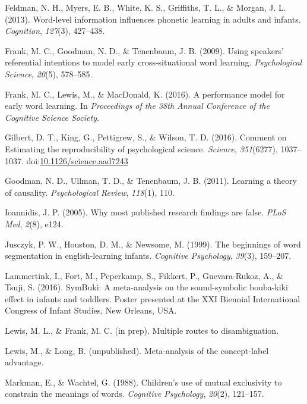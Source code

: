 \documentclass[english,floatsintext,man]{apa6}
\begin{document}
\hypertarget{ref-feldman2013word}{}
Feldman, N. H., Myers, E. B., White, K. S., Griffiths, T. L., \& Morgan,
J. L. (2013). Word-level information influences phonetic learning in
adults and infants. \emph{Cognition}, \emph{127}(3), 427--438.

\hypertarget{ref-frank2009using}{}
Frank, M. C., Goodman, N. D., \& Tenenbaum, J. B. (2009). Using
speakers' referential intentions to model early cross-situational word
learning. \emph{Psychological Science}, \emph{20}(5), 578--585.

\hypertarget{ref-frank2016performance}{}
Frank, M. C., Lewis, M., \& MacDonald, K. (2016). A performance model
for early word learning. In \emph{Proceedings of the 38th Annual
Conference of the Cognitive Science Society}.

\hypertarget{ref-Gilbert1037}{}
Gilbert, D. T., King, G., Pettigrew, S., \& Wilson, T. D. (2016).
Comment on Estimating the reproducibility of psychological science.
\emph{Science}, \emph{351}(6277), 1037--1037.
doi:\href{https://doi.org/10.1126/science.aad7243}{10.1126/science.aad7243}

\hypertarget{ref-goodman2011learning}{}
Goodman, N. D., Ullman, T. D., \& Tenenbaum, J. B. (2011). Learning a
theory of causality. \emph{Psychological Review}, \emph{118}(1), 110.

\hypertarget{ref-ioannidis2005most}{}
Ioannidis, J. P. (2005). Why most published research findings are false.
\emph{PLoS Med}, \emph{2}(8), e124.

\hypertarget{ref-jusczyk1999beginnings}{}
Jusczyk, P. W., Houston, D. M., \& Newsome, M. (1999). The beginnings of
word segmentation in english-learning infants. \emph{Cognitive
Psychology}, \emph{39}(3), 159--207.

\hypertarget{ref-lammertink2016}{}
Lammertink, I., Fort, M., Peperkamp, S., Fikkert, P., Guevara-Rukoz, A.,
\& Tsuji, S. (2016). SymBuki: A meta-analysis on the sound-symbolic
bouba-kiki effect in infants and toddlers. Poster presented at the XXI
Biennial International Congress of Infant Studies, New Orleans, USA.

\hypertarget{ref-lfprep}{}
Lewis, M. L., \& Frank, M. C. (in prep). Multiple routes to
disambiguation.

\hypertarget{ref-lewisunpublished}{}
Lewis, M., \& Long, B. (unpublished). Meta-analysis of the concept-label
advantage.

\hypertarget{ref-markman1988}{}
Markman, E., \& Wachtel, G. (1988). Children's use of mutual exclusivity
to constrain the meanings of words. \emph{Cognitive Psychology},
\emph{20}(2), 121--157.
\end{document}

